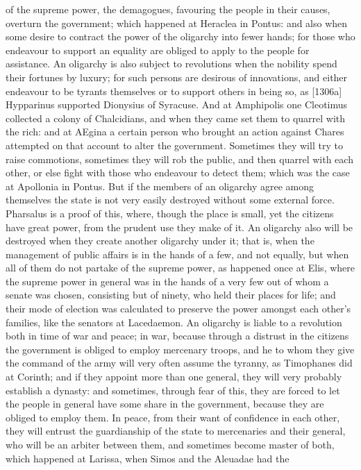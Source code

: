 of the supreme power, the demagogues, favouring the people in their
causes, overturn the government; which happened at Heraclea in Pontus: and
also when some desire to contract the power of the oligarchy into fewer
hands; for those who endeavour to support an equality are obliged to apply
to the people for assistance. An oligarchy is also subject to revolutions
when the nobility spend their fortunes by luxury; for such persons are
desirous of innovations, and either endeavour to be tyrants themselves or
to support others in being so, as [1306a] Hypparinus supported Dionysius
of Syracuse. And at Amphipolis one Cleotimus collected a colony of
Chalcidians, and when they came set them to quarrel with the rich: and at
AEgina a certain person who brought an action against Chares attempted on
that account to alter the government. Sometimes they will try to raise
commotions, sometimes they will rob the public, and then quarrel with each
other, or else fight with those who endeavour to detect them; which was
the case at Apollonia in Pontus. But if the members of an oligarchy agree
among themselves the state is not very easily destroyed without some
external force. Pharsalus is a proof of this, where, though the place is
small, yet the citizens have great power, from the prudent use they make
of it. An oligarchy also will be destroyed when they create another
oligarchy under it; that is, when the management of public affairs is in
the hands of a few, and not equally, but when all of them do not partake
of the supreme power, as happened once at Elis, where the supreme power in
general was in the hands of a very few out of whom a senate was chosen,
consisting but of ninety, who held their places for life; and their mode
of election was calculated to preserve the power amongst each other's
families, like the senators at Lacedaemon. An oligarchy is liable to a
revolution both in time of war and peace; in war, because through a
distrust in the citizens the government is obliged to employ mercenary
troops, and he to whom they give the command of the army will very often
assume the tyranny, as Timophanes did at Corinth; and if they appoint more
than one general, they will very probably establish a dynasty: and
sometimes, through fear of this, they are forced to let the people in
general have some share in the government, because they are obliged to
employ them. In peace, from their want of confidence in each other, they
will entrust the guardianship of the state to mercenaries and their
general, who will be an arbiter between them, and sometimes become master
of both, which happened at Larissa, when Simos and the Aleuadae had the
